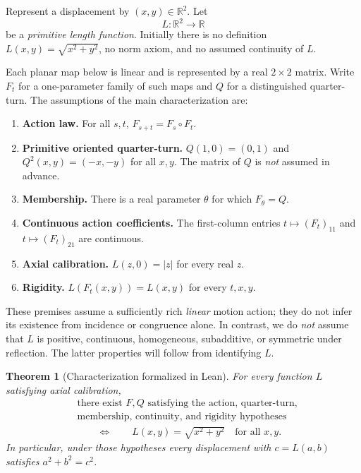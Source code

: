 \documentclass[11pt,a4paper]{article}
\newtheorem{theorem}{Theorem}[section]
\begin{document}
Represent a displacement by $(x,y)\in\mathbb R^2$. Let
\[
 L:\mathbb R^2\longrightarrow\mathbb R
\]
be a \emph{primitive length function}. Initially there is no
definition $L(x,y)=\sqrt{x^2+y^2}$, no norm axiom, and no
assumed continuity of $L$.

Each planar map below is linear and is represented by a real
$2\times 2$ matrix. Write $F_t$ for a one-parameter family of
such maps and $Q$ for a distinguished quarter-turn. The assumptions
of the main characterization are:
\begin{enumerate}
 \item \textbf{Action law.} For all $s,t$, $F_{s+t}=F_s\circ F_t$.
 \item \textbf{Primitive oriented quarter-turn.}
       $Q(1,0)=(0,1)$ and $Q^2(x,y)=(-x,-y)$ for all $x,y$.
       The matrix of $Q$ is \emph{not} assumed in advance.
 \item \textbf{Membership.} There is a real parameter $\theta$
       for which $F_\theta=Q$.
 \item \textbf{Continuous action coefficients.}
       The first-column entries
       $t\mapsto (F_t)_{11}$ and
       $t\mapsto (F_t)_{21}$ are continuous.
 \item \textbf{Axial calibration.}
       $L(z,0)=|z|$ for every real $z$.
 \item \textbf{Rigidity.}
       $L(F_t(x,y))=L(x,y)$ for every $t,x,y$.
\end{enumerate}
These premises assume a sufficiently rich \emph{linear} motion
action; they do not infer its existence from incidence or
congruence alone. In contrast, we do \emph{not} assume that
$L$ is positive, continuous, homogeneous, subadditive, or
symmetric under reflection. The latter properties will follow
from identifying $L$.

\begin{theorem}[Characterization formalized in Lean]
\label{thm:main}
For every function $L$ satisfying axial calibration,
\[
\begin{split}
 &\text{there exist }F,Q\text{ satisfying the action,
 quarter-turn,}\\[-1pt]
 &\text{membership, continuity, and rigidity hypotheses}\\
 &\qquad\Longleftrightarrow\qquad
 L(x,y)=\sqrt{x^2+y^2}\quad\text{for all }x,y.
\end{split}
\]
In particular, under those hypotheses every displacement with
$c=L(a,b)$ satisfies $a^2+b^2=c^2$.
\end{theorem}
\end{document}

